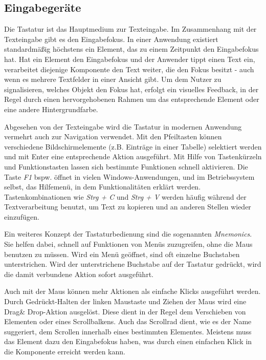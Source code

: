 \subsection{Eingabegeräte} \label{sec:inputDevices}
Die Tastatur ist das Hauptmedium zur Texteingabe. Im Zusammenhang mit der Texteingabe gibt es den Eingabefokus. In einer Anwendung existiert standardmäßig höchstens ein Element, das zu einem Zeitpunkt den Eingabefokus hat. Hat ein Element den Eingabefokus und der Anwender tippt einen Text ein, verarbeitet diejenige Komponente den Text weiter, die den Fokus besitzt - auch wenn es mehrere Textfelder in einer Ansicht gibt. Um dem Nutzer zu signalisieren, welches Objekt den Fokus hat, erfolgt ein visuelles Feedback, in der Regel durch einen hervorgehobenen Rahmen um das entsprechende Element oder eine andere Hintergrundfarbe.\par
Abgesehen von der Texteingabe wird die Tastatur in modernen Anwendung vermehrt auch zur Navigation verwendet. Mit den Pfeiltasten können verschiedene Bildschirmelemente (z.B. Einträge in einer Tabelle) selektiert werden und mit Enter eine entsprechende Aktion ausgeführt. Mit Hilfe von Tastenkürzeln und Funktionstasten lassen sich bestimmte Funktionen schnell aktivieren. Die Taste \textit{F1} bspw. öffnet in vielen Windows-Anwendungen, und im Betriebssystem selbst, das Hilfemenü, in dem Funktionalitäten erklärt werden. Tastenkombinationen wie \textit{Strg + C} und \textit{Strg + V} werden häufig während der Textverarbeitung benutzt, um Text zu kopieren und an anderen Stellen wieder einzufügen.\par
Ein weiteres Konzept der Tastaturbedienung sind die sogenannten \textit{Mnemonics}. Sie helfen dabei, schnell auf Funktionen von Menüs zuzugreifen, ohne die Maus benutzen zu müssen. Wird ein Menü geöffnet, sind oft einzelne Buchstaben unterstrichen. Wird der unterstrichene Buchstabe auf der Tastatur gedrückt, wird die damit verbundene Aktion sofort ausgeführt.\par
{}
Auch mit der Maus können mehr Aktionen als einfache Klicks ausgeführt werden. Durch Gedrückt-Halten der linken Maustaste und Ziehen der Maus wird eine Drag\& Drop-Aktion ausgelöst. Diese dient in der Regel dem Verschieben von Elementen oder eines Scrollbalkens. Auch das Scrollrad dient, wie es der Name suggeriert, dem Scrollen innerhalb eines bestimmten Elementes. Meistens muss das Element dazu den Eingabefokus haben, was durch einen einfachen Klick in die Komponente erreicht werden kann.\par
